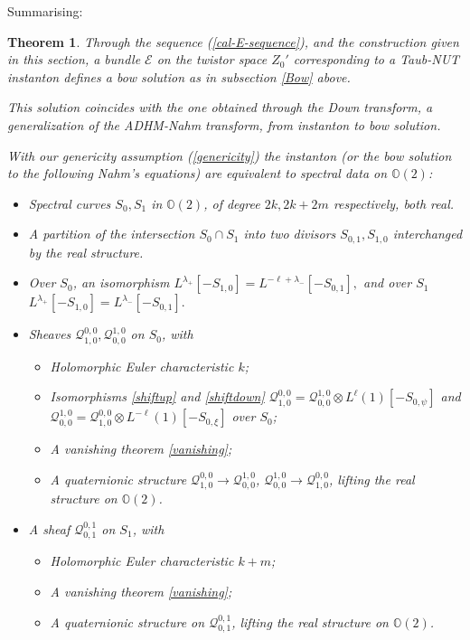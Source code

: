 \documentclass[12pt]{article}
\newtheorem{theorem}{Theorem}[section]
\theoremstyle{definition}
\theoremstyle{remark}
\numberwithin{theorem}{section}
\def\bO{{\mathbb {O}}}
\def\pE{{\mathcal E}}
\def\pQ{{\mathcal Q}}
\begin{document}
 Summarising:
 
 \begin{theorem} 
 Through the sequence (\ref{cal-E-sequence}), and the construction given in this section, a bundle $\pE$ on the twistor space $Z_0'$ corresponding to a Taub-NUT instanton defines a bow solution as in subsection \ref{Bow} above.
 
 This solution coincides with the one obtained through the Down transform, a generalization of the ADHM-Nahm transform, from instanton to bow solution.
 
 With our genericity assumption (\ref{genericity}) the instanton (or the bow solution to the following Nahm's equations) are equivalent to {\it spectral data} on $\bO(2)$:
 \begin{itemize}
 \item {\it Spectral curves} $S_0, S_1$ in $\bO(2)$, of degree $2k, 2k+2m$ respectively, both real.
 \item  A partition of the intersection $S_0\cap S_1$ into two divisors $S_{0,1}, S_{1,0}$ interchanged by the real structure.
 \item Over $S_0$, an isomorphism $L^{ \lambda_+}  [-S_{1,0}] =  L^{ -\ell +\lambda_-} [-S_{0,1}],$  
 and over $S_1$ $L^{  \lambda_+}  [-S_{1,0}]  =  L^{ \lambda_-} [-S_{0,1}].$
  \item  Sheaves $\pQ^{0 ,0}_{ 1,0}, \pQ_{0 ,0}^{ 1,0}$ on $S_0$, with 
 \begin{itemize}
 \item Holomorphic Euler characteristic $k$;
 \item  Isomorphisms \eqref{shiftup} and \eqref{shiftdown}   $\pQ_{1,0}^{0,0} =  \pQ_{0 ,0}^{ 1,0}\otimes L^{ \ell}(1)[-S_{0,\psi}]$ and  $\pQ^{1,0}_{0,0}= \pQ^{0 ,0}_{ 1,0}\otimes L^{ -\ell}(1)[-S_{0,\xi}] $ over $S_0$;
 \item A vanishing theorem \ref{vanishing};
  \item A quaternionic structure $\pQ^{0 ,0}_{ 1,0}\rightarrow \pQ_{0 ,0}^{ 1,0}$, $\pQ_{0 ,0}^{ 1,0}\rightarrow \pQ^{0 ,0}_{ 1,0}$, lifting the real structure on $\bO(2)$.

 \end{itemize}
  \item A sheaf $\pQ^{0 ,1}_{ 0,1}$ on $S_1$, with 
  \begin{itemize}
 \item Holomorphic Euler characteristic $k+m$;
 \item A vanishing theorem \ref{vanishing};
 \item A quaternionic structure on $\pQ^{0 ,1}_{ 0,1}$, lifting the real structure on $\bO(2)$.
 \end{itemize}
 \end{itemize} 
 \end{theorem}
 
\end{document}
